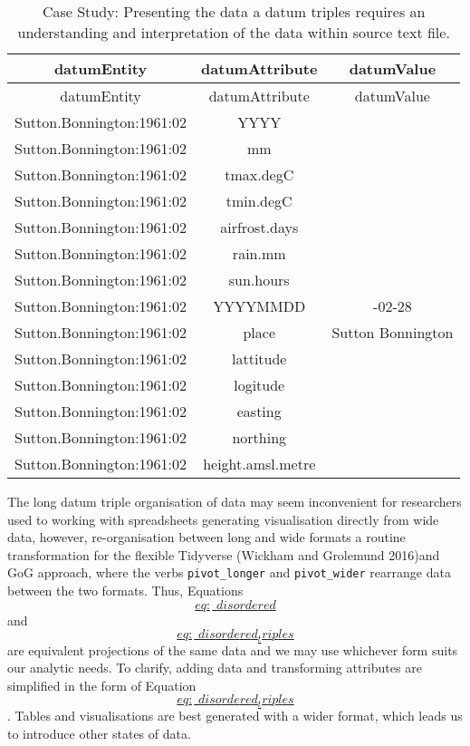 \documentclass[
]{article}
\begin{document}
\hypertarget{Tab:DatumTriples}{}
\begin{longtable}[]{@{}ccc@{}}
\caption{Case Study: Presenting the data a datum triples requires an
understanding and interpretation of the data within source text
file.}\tabularnewline
\toprule
datumEntity & datumAttribute & datumValue \\
\midrule
\endfirsthead
\toprule
datumEntity & datumAttribute & datumValue \\
\midrule
\endhead
Sutton.Bonnington:1961:02 & YYYY & \\
Sutton.Bonnington:1961:02 & mm & \\
Sutton.Bonnington:1961:02 & tmax.degC & \\
Sutton.Bonnington:1961:02 & tmin.degC & \\
Sutton.Bonnington:1961:02 & airfrost.days & \\
Sutton.Bonnington:1961:02 & rain.mm & \\
Sutton.Bonnington:1961:02 & sun.hours & \\
Sutton.Bonnington:1961:02 & YYYYMMDD & -02-28 \\
Sutton.Bonnington:1961:02 & place & Sutton Bonnington \\
Sutton.Bonnington:1961:02 & lattitude & \\
Sutton.Bonnington:1961:02 & logitude & \\
Sutton.Bonnington:1961:02 & easting & \\
Sutton.Bonnington:1961:02 & northing & \\
Sutton.Bonnington:1961:02 & height.amsl.metre & \\
\bottomrule
\end{longtable}

The long datum triple organisation of data may seem inconvenient for
researchers used to working with spreadsheets generating visualisation
directly from wide data, however, re-organisation between long and wide
formats a routine transformation for the flexible Tidyverse (Wickham and
Grolemund 2016)and GoG approach, where the verbs \texttt{pivot\_longer}
and \texttt{pivot\_wider} rearrange data between the two formats. Thus,
Equations \protect\hyperlink{eq:_disordered}{\[eq:\_disordered\]} and
\protect\hyperlink{eq:_disordered_triples}{\[eq:\_disordered_triples\]}
are equivalent projections of the same data and we may use whichever
form suits our analytic needs. To clarify, adding data and transforming
attributes are simplified in the form of
Equation~\protect\hyperlink{eq:_disordered_triples}{\[eq:\_disordered_triples\]}.
Tables and visualisations are best generated with a wider format, which
leads us to introduce other states of data.
\end{document}
